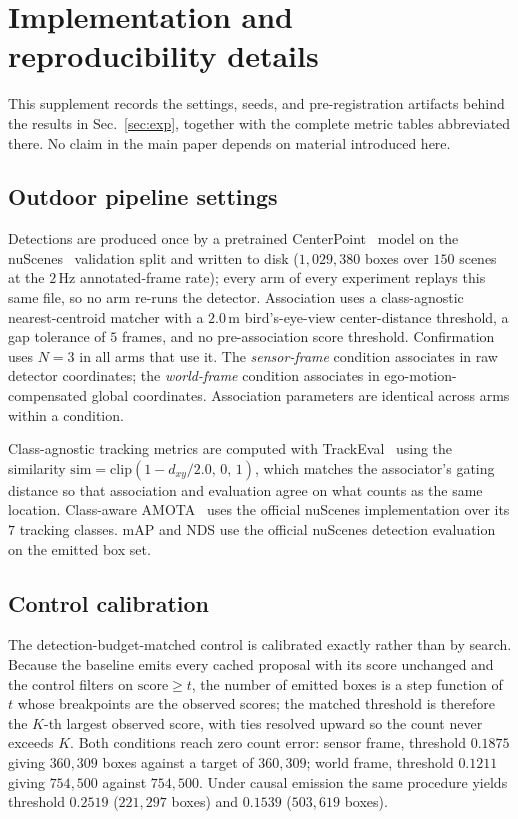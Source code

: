 \section{Implementation and reproducibility details}
\label{sec:supp-repro}

This supplement records the settings, seeds, and pre-registration artifacts
behind the results in Sec.~\ref{sec:exp}, together with the complete metric
tables abbreviated there. No claim in the main paper depends on material
introduced here.

\subsection{Outdoor pipeline settings}
\label{sec:supp-outdoor}

Detections are produced once by a pretrained CenterPoint~\cite{centerpoint}
model on the nuScenes~\cite{nuscenes} validation split and written to disk
($1{,}029{,}380$ boxes over $150$ scenes at the $2$\,Hz annotated-frame rate);
every arm of every experiment replays this same file, so no arm re-runs the
detector. Association uses a class-agnostic nearest-centroid matcher with a
$2.0$\,m bird's-eye-view center-distance threshold, a gap tolerance of $5$
frames, and no pre-association score threshold. Confirmation uses $N{=}3$ in
all arms that use it. The \emph{sensor-frame} condition associates in raw
detector coordinates; the \emph{world-frame} condition associates in
ego-motion-compensated global coordinates. Association parameters are
identical across arms within a condition.

Class-agnostic tracking metrics are computed with TrackEval~\cite{hota,idf1}
using the similarity $\mathrm{sim}=\mathrm{clip}(1-d_{xy}/2.0,\,0,\,1)$, which
matches the associator's gating distance so that association and evaluation
agree on what counts as the same location. Class-aware
AMOTA~\cite{nuscenes_tracking} uses the official nuScenes implementation over
its $7$ tracking classes. mAP and NDS use the official nuScenes detection
evaluation on the emitted box set.

\subsection{Control calibration}
\label{sec:supp-calib}

The detection-budget-matched control is calibrated exactly rather than by
search. Because the baseline emits every cached proposal with its score
unchanged and the control filters on \mbox{$\text{score} \ge t$}, the number of
emitted boxes is a step function of $t$ whose breakpoints are the observed
scores; the matched threshold is therefore the $K$-th largest observed score,
with ties resolved upward so the count never exceeds $K$. Both conditions
reach zero count error:
sensor frame, threshold $0.1875$ giving $360{,}309$ boxes against a target of
$360{,}309$; world frame, threshold $0.1211$ giving $754{,}500$ against
$754{,}500$. Under causal emission the same procedure yields threshold
$0.2519$ ($221{,}297$ boxes) and $0.1539$ ($503{,}619$ boxes).

